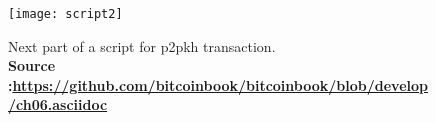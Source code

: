 \begin{figure}[!htbp]
    \centering
    \texttt{[image: script2]}
    \caption[Next part of a script for \gls{p2pkh} transaction]
    {Next part of a script for \gls{p2pkh} transaction. \\ \textbf{Source :\url{https://github.com/bitcoinbook/bitcoinbook/blob/develop/ch06.asciidoc}}}
    \label{fig:script2}
\end{figure}
    